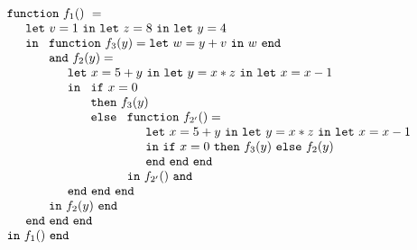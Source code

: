 \begin{equation}
\label{FunctionalConstructionProgram9}
\begin{array}{l}
\mathtt{function}\ f_1()\ = \\
  \quad
  \begin{array}{l}
     \mathtt{let}\ v = 1 \ 
     \mathtt{in\ let}\ z = 8 \ 
     \mathtt{in\ let}\ y = 4\\
     \mathtt{in}\ 
     \begin{array}[t]{l}
       \mathtt{function}\ f_3(y) = 
          \mathtt{let}\ w = y+v\ \mathtt{in}\ w\ \mathtt{end}\\
       \mathtt{and}\ f_2(y) =\\
         \quad
         \begin{array}{l}
           \mathtt{let}\ x = 5+y\
           \mathtt{in\ let}\ y = x*z\
           \mathtt{in\ let}\ x = x-1\\
           \mathtt{in}\
           \begin{array}[t]{l}
             \mathtt{if}\ x=0\\
             \mathtt{then}\ f_3(y)\\ 
             \mathtt{else}\
               \begin{array}[t]{l}
                 \mathtt{function}\ f_{2'}() =\\
                 \quad
                 \begin{array}{l}
                   \mathtt{let}\ x = 5+y\
                   \mathtt{in\ let}\ y = x*z\
                   \mathtt{in\ let}\ x = x-1\\
                   \mathtt{in}\
                     \mathtt{if}\ x=0\
                     \mathtt{then}\ f_3(y)\ 
                     \mathtt{else}\ f_2(y)\\
                   \mathtt{end\ end\ end}
                 \end{array}\\
                 \mathtt{in}\ f_{2'}()\ \mathtt{and}
               \end{array}
           \end{array}\\
           \mathtt{end\ end\ end}
         \end{array}\\
     \mathtt{in}\ f_2(y)\ \mathtt{end}
     \end{array}\\
     \mathtt{end\ end\ end}\\
   \end{array}\\
\mathtt{in}\ f_1()\  \mathtt{end}
\end{array}
\end{equation}
